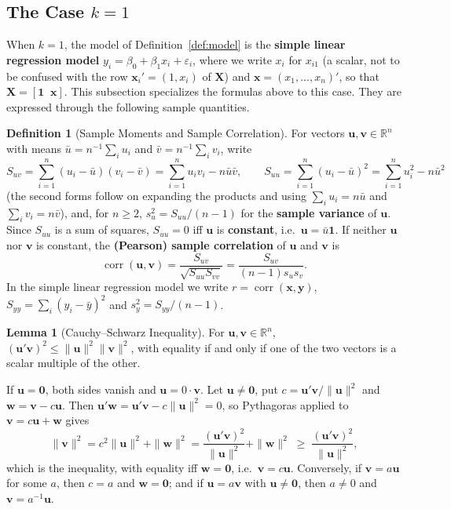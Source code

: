 \documentclass[12pt,a4paper]{article}
\makeatletter
\theoremstyle{definition}
\newtheorem{definition}[theorem]{Definition}
\newtheorem{lemma}[theorem]{Lemma}
\renewenvironment{proof}[1][\proofname]{\par
  \pushQED{\qed}%
  \normalfont \topsep6\p@\@plus6\p@\relax
  \trivlist
  \item[\hskip\labelsep\bfseries #1\@addpunct{.}]\ignorespaces
}{%
  \popQED\endtrivlist\@endpefalse
}
\DeclareMathOperator\corr{corr}
\newcommand{\bX}{\mathbf{X}}
\newcommand{\by}{\mathbf{y}}
\newcommand{\bx}{\mathbf{x}}
\newcommand{\bone}{\mathbf{1}}
\newcommand{\bzero}{\mathbf{0}}
\newcommand{\bw}{\mathbf{w}}
\newcommand{\bv}{\mathbf{v}}
\newcommand{\Real}{\mathbb{R}}
\newcommand{\bu}{\mathbf{u}}
\makeatother
\begin{document}
\subsection{The Case \texorpdfstring{$k = 1$}{k = 1}}\label{sec:k1}

When $k = 1$, the model of Definition~\ref{def:model} is the \textbf{simple linear regression model} $y_i = \beta_0 + \beta_1 x_i + \varepsilon_i$, where we write $x_i$ for $x_{i1}$ (a scalar, not to be confused with the row $\bx_i' = (1, x_i)$ of $\bX$) and $\bx = (x_1, \ldots, x_n)'$, so that $\bX = [\bone \;\; \bx]$. This subsection specializes the formulas above to this case. They are expressed through the following sample quantities.

\begin{definition}[Sample Moments and Sample Correlation]\label{def:corr}
For vectors $\bu, \bv \in \Real^n$ with means $\bar u = n^{-1}\sum_i u_i$ and $\bar v = n^{-1}\sum_i v_i$, write
\[
S_{uv} = \sum_{i=1}^n (u_i - \bar u)(v_i - \bar v) = \sum_{i=1}^n u_iv_i - n\bar u\bar v, \qquad S_{uu} = \sum_{i=1}^n (u_i - \bar u)^2 = \sum_{i=1}^n u_i^2 - n\bar u^2
\]
(the second forms follow on expanding the products and using $\sum_i u_i = n\bar u$ and $\sum_i v_i = n\bar v$), and, for $n \geqslant 2$, $s_u^2 = S_{uu}/(n-1)$ for the \textbf{sample variance} of $\bu$. Since $S_{uu}$ is a sum of squares, $S_{uu} = 0$ iff $\bu$ is \textbf{constant}, i.e.\ $\bu = \bar u\bone$. If neither $\bu$ nor $\bv$ is constant, the \textbf{(Pearson) sample correlation} of $\bu$ and $\bv$ is
\[
\corr(\bu, \bv) = \frac{S_{uv}}{\sqrt{S_{uu}S_{vv}}} = \frac{S_{uv}}{(n-1)s_us_v}.
\]
In the simple linear regression model we write $r = \corr(\bx, \by)$, $S_{yy} = \sum_i(y_i - \bar y)^2$ and $s_y^2 = S_{yy}/(n-1)$.
\end{definition}

\begin{lemma}[Cauchy--Schwarz Inequality]\label{lem:cs}
For $\bu, \bv \in \Real^n$, $(\bu'\bv)^2 \leqslant \|\bu\|^2\|\bv\|^2$, with equality if and only if one of the two vectors is a scalar multiple of the other.
\end{lemma}

\begin{proof}
If $\bu = \bzero$, both sides vanish and $\bu = 0 \cdot \bv$. Let $\bu \neq \bzero$, put $c = \bu'\bv/\|\bu\|^2$ and $\bw = \bv - c\bu$. Then $\bu'\bw = \bu'\bv - c\|\bu\|^2 = 0$, so Pythagoras applied to $\bv = c\bu + \bw$ gives
\[
\|\bv\|^2 = c^2\|\bu\|^2 + \|\bw\|^2 = \frac{(\bu'\bv)^2}{\|\bu\|^2} + \|\bw\|^2 \;\geqslant\; \frac{(\bu'\bv)^2}{\|\bu\|^2},
\]
which is the inequality, with equality iff $\bw = \bzero$, i.e.\ $\bv = c\bu$. Conversely, if $\bv = a\bu$ for some $a$, then $c = a$ and $\bw = \bzero$; and if $\bu = a\bv$ with $\bu \neq \bzero$, then $a \neq 0$ and $\bv = a^{-1}\bu$.
\end{proof}
\end{document}
